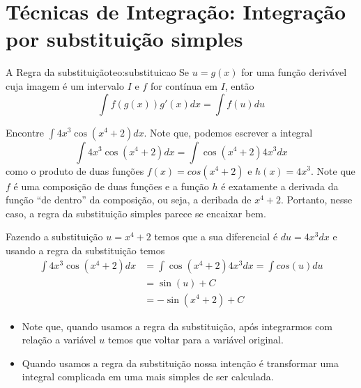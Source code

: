 \section{Técnicas de Integração: Integração por substituição simples}

\begin{teorema}{A Regra da substituição}{teo:substituicao}
  Se $u=g(x)$ for uma função derivável cuja imagem é um intervalo
  $I$ e $f$ for contínua em $I$, então
  \[
    \int f(g(x)) g'(x) dx= \int f(u) du
  \]
\end{teorema}

\begin{example}
  Encontre \(\int 4x^3 \cos(x^4+2)dx\).
  \solution
  Note que, podemos escrever a integral
  \[
    \int 4x^3 \cos(x^4+2)dx =  \int  \cos(x^4+2) 4x^3dx
  \]
  como o produto de duas funções $f(x)=cos(x^4+2)$ e $h(x)= 4x^3$. Note que $f$
  é uma composição de duas funções e a função $h$ é exatamente a derivada da
  função ``de dentro'' da composição, ou seja, a deribada de $x^4+2$. Portanto,
  nesse caso, a regra da substituição simples parece se encaixar bem.

  Fazendo a substituição $u=x^4+2$ temos que a sua diferencial é $du=4x^3dx$ e
  usando a regra da substituição temos
  \begin{align*}
    \int 4x^3 \cos(x^4+2)dx
    & =  \int  \cos(x^4+2) 4x^3dx= \int cos(u) du \\
    & = \sin(u)+C \\
    & = -\sin(x^4+2)+C
  \end{align*}
\end{example}

\begin{itemize}
  \item Note que, quando usamos a regra da substituição, após integrarmos com
      relação a variável $u$ temos que voltar para a variável original.

  \item Quando usamos a regra da substituição nossa intenção é transformar uma
      integral complicada em uma mais simples de ser calculada.

\end{itemize}

